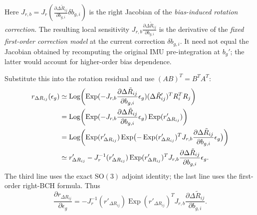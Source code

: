 \documentclass[11pt,a4paper]{article}
\newcommand{\Exp}{\operatorname{Exp}}
\newcommand{\Log}{\operatorname{Log}}
\newcommand{\SO}{\mathrm{SO}}
\begin{document}
Here $J_{r,b}=J_r(\frac{\partial\Delta\tilde R_{ij}}{\partial b_{g,i}}\delta b_{g,i})$ is the right
Jacobian of the \emph{bias-induced rotation correction}.
The resulting local sensitivity $J_{r,b}\frac{\partial\Delta\tilde R_{ij}}{\partial b_{g,i}}$ is the
derivative of the \emph{fixed first-order correction model} at
the current correction $\delta b_{g,i}$. It need not equal the
Jacobian obtained by recomputing the original IMU pre-integration
at $b_g'$; the latter would account for higher-order bias dependence.

Substitute this into the rotation residual and use
$(AB)^T=B^TA^T$:
\begin{align}
r_{\Delta R_{ij}}(\epsilon_g)
&\simeq\Log\!\left(
\Exp(-J_{r,b}\frac{\partial\Delta\tilde R_{ij}}{\partial b_{g,i}}\epsilon_g)
(\Delta\tilde R'_{ij})^TR_i^TR_j\right)\notag\\
&=\Log\!\left(\Exp(-J_{r,b}\frac{\partial\Delta\tilde R_{ij}}{\partial b_{g,i}}\epsilon_g)
\Exp(r'_{\Delta R_{ij}})\right)\notag\\
&=\Log\!\left(\Exp(r'_{\Delta R_{ij}})
\Exp\bigl(-\Exp(r'_{\Delta R_{ij}})^T
J_{r,b}\frac{\partial\Delta\tilde R_{ij}}{\partial b_{g,i}}\epsilon_g\bigr)\right)\notag\\
&\simeq r'_{\Delta R_{ij}}
-J_r^{-1}(r'_{\Delta R_{ij}})
\Exp(r'_{\Delta R_{ij}})^T
J_{r,b}\frac{\partial\Delta\tilde R_{ij}}{\partial b_{g,i}}\epsilon_g.
\end{align}
The third line uses the exact $\SO(3)$ adjoint identity;
the last line uses the first-order right-BCH formula. Thus
\begin{equation}\label{eq:JresBg}
\boxed{\frac{\partial r_{\Delta R_{ij}}}{\partial\epsilon_g}
=-J_r^{-1}(r'_{\Delta R_{ij}})
\Exp(r'_{\Delta R_{ij}})^TJ_{r,b}\frac{\partial\Delta\tilde R_{ij}}{\partial b_{g,i}}.}
\end{equation}
\end{document}
